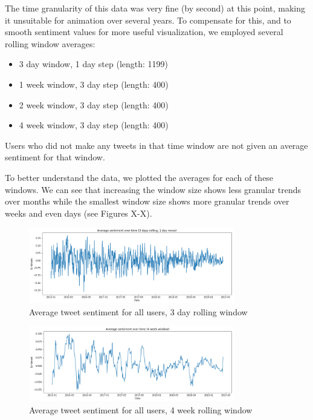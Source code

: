 \documentclass[11pt]{article}
\begin{document}
The time granularity of this data was very fine (by second) at this point, making it unsuitable for animation over several years. To compensate for this, and to smooth sentiment values for more useful visualization, we employed several rolling window averages:\newline
\begin{itemize}
    \item 3 day window, 1 day step (length: 1199)
    \item 1 week window, 3 day step (length: 400)
    \item 2 week window, 3 day step (length: 400)
    \item 4 week window, 3 day step (length: 400)
\end{itemize}

Users who did not make any tweets in that time window are not given an average sentiment for that window.\newline

To better understand the data, we plotted the averages for each of these windows. We can see that increasing the window size shows less granular trends over months while the smallest window size shows more granular trends over weeks and even days (see Figures X-X).

\begin{figure}[h!]
    \centering
     \includegraphics[width=0.8\textwidth]{avg_sentiment_over_time_big__3day}
        \caption{Average tweet sentiment for all users, 3 day rolling window}
\end{figure}

\begin{figure}[h!]
    \centering
     \includegraphics[width=0.8\textwidth]{avg_sentiment_over_time_big_4week}
        \caption{Average tweet sentiment for all users, 4 week rolling window}
\end{figure}
\end{document}
